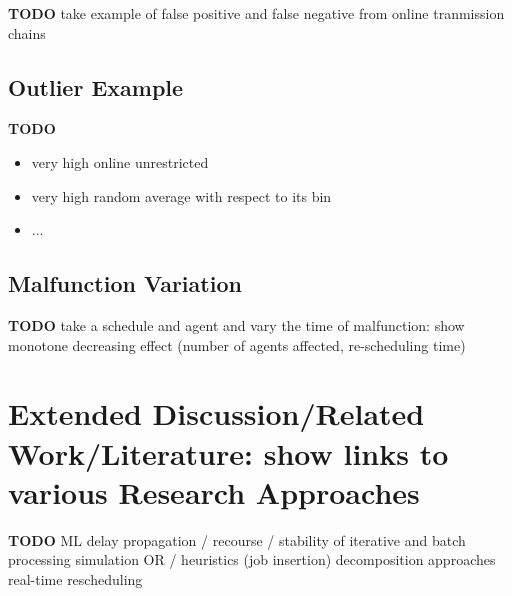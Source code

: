 \documentclass{article}
\begin{document}
\label{subsec:false_positives_false_negatives}
\begin{mdframed}
{\bf TODO } take example of false positive and false negative from online tranmission chains
\end{mdframed}


\subsection{Outlier Example}\label{subsec:outlier}
\begin{mdframed}
{\bf TODO}
\begin{itemize}
    \item very high online unrestricted
    \item very high random average with respect to its bin
    \item ...
\end{itemize}
\end{mdframed}



\subsection{Malfunction Variation}\label{subsec:malfunction_variation}


\begin{mdframed}
{\bf TODO } take a schedule and agent and vary the time of malfunction: show monotone decreasing effect (number of agents affected, re-scheduling time)
\end{mdframed}




\section{Extended Discussion/Related Work/Literature: show links to various Research Approaches}

\begin{mdframed}
{\bf TODO}         ML
        delay propagation / recourse / stability of iterative and batch processing
        simulation
        OR / heuristics (job insertion)
        decomposition approaches
        real-time rescheduling

\end{mdframed}
\end{document}
